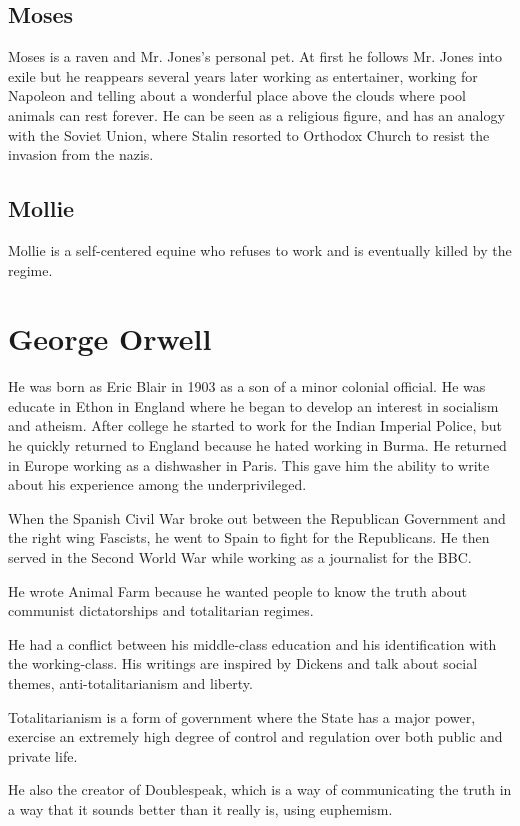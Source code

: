 \documentclass{article}
\begin{document}
    \subsection{Moses}
    Moses is a raven and Mr. Jones's personal pet. At first he follows Mr. Jones into exile but he reappears several years later working as entertainer, working for Napoleon and telling about a wonderful place above the clouds where pool animals can rest forever. 
    He can be seen as a religious figure, and has an analogy with the Soviet Union, where Stalin resorted to Orthodox Church to resist the invasion from the nazis.

    \subsection{Mollie}
    Mollie is a self-centered equine who refuses to work and is eventually killed by the regime.

    \section{George Orwell}
    He was born as Eric Blair in 1903 as a son of a minor colonial official. He was educate in Ethon in England where he began to develop an interest in socialism and atheism. After college he started to work for the Indian Imperial Police, but he quickly returned to England because he hated working in Burma. He returned in Europe working as a dishwasher in Paris. This gave him the ability to write about his experience among the underprivileged.

    When the Spanish Civil War broke out between the Republican Government and the right wing Fascists, he went to Spain to fight for the Republicans. He then served in the Second World War while working as a journalist for the BBC.

    He wrote Animal Farm because he wanted people to know the truth about communist dictatorships and totalitarian regimes.

    He had a conflict between his middle-class education and his identification with the working-class. His writings are inspired by Dickens and talk about social themes, anti-totalitarianism and liberty.

    Totalitarianism is a form of government where the State has a major power, exercise an extremely high degree of control and regulation over both public and private life.

    He also the creator of Doublespeak, which is a way of communicating the truth in a way that it sounds better than it really is, using euphemism.
\end{document}
